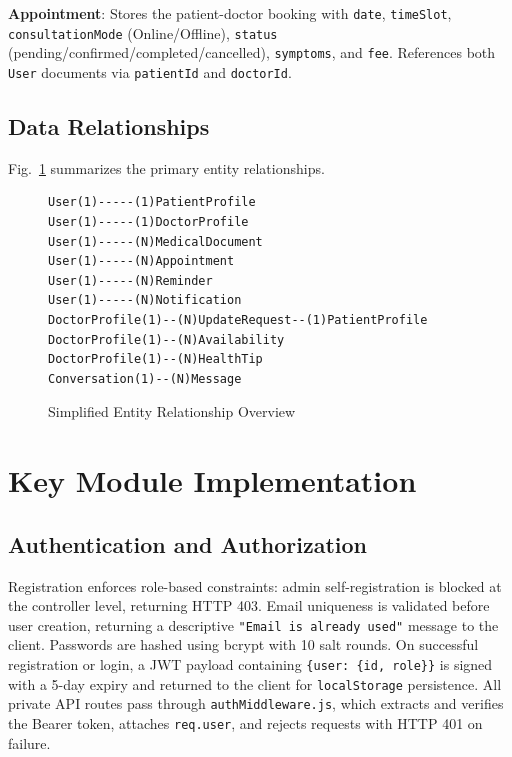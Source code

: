 \textbf{Appointment}: Stores the patient-doctor booking with \texttt{date}, \texttt{timeSlot}, \texttt{consultationMode} (Online/Offline), \texttt{status} (pending/confirmed/completed/cancelled), \texttt{symptoms}, and \texttt{fee}. References both \texttt{User} documents via \texttt{patientId} and \texttt{doctorId}.

\subsection{Data Relationships}

Fig.~\ref{fig:erd} summarizes the primary entity relationships.

\begin{figure}[h]
\centering
\begin{verbatim}
User(1)-----(1)PatientProfile
User(1)-----(1)DoctorProfile
User(1)-----(N)MedicalDocument
User(1)-----(N)Appointment
User(1)-----(N)Reminder
User(1)-----(N)Notification
DoctorProfile(1)--(N)UpdateRequest--(1)PatientProfile
DoctorProfile(1)--(N)Availability
DoctorProfile(1)--(N)HealthTip
Conversation(1)--(N)Message
\end{verbatim}
\caption{Simplified Entity Relationship Overview}
\label{fig:erd}
\end{figure}

\section{Key Module Implementation}

\subsection{Authentication and Authorization}

Registration enforces role-based constraints: admin self-registration is blocked at the controller level, returning HTTP 403. Email uniqueness is validated before user creation, returning a descriptive \texttt{"Email is already used"} message to the client. Passwords are hashed using bcrypt with 10 salt rounds. On successful registration or login, a JWT payload containing \texttt{\{user: \{id, role\}\}} is signed with a 5-day expiry and returned to the client for \texttt{localStorage} persistence. All private API routes pass through \texttt{authMiddleware.js}, which extracts and verifies the Bearer token, attaches \texttt{req.user}, and rejects requests with HTTP 401 on failure.

